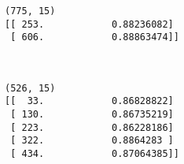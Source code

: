 \documentclass{article}
\begin{document}
    \begin{Verbatim}[commandchars=\\\{\}]
(775, 15)
[[ 253.            0.88236082]
 [ 606.            0.88863474]]
    \end{Verbatim}

    \begin{center}
    \end{center}
    { \hspace*{\fill} \\}
    
    \begin{Verbatim}[commandchars=\\\{\}]
(526, 15)
[[  33.            0.86828822]
 [ 130.            0.86735219]
 [ 223.            0.86228186]
 [ 322.            0.8864283 ]
 [ 434.            0.87064385]]
    \end{Verbatim}

    \begin{center}
    \end{center}
    { \hspace*{\fill} \\}
    

    
    
    
    
\end{document}
